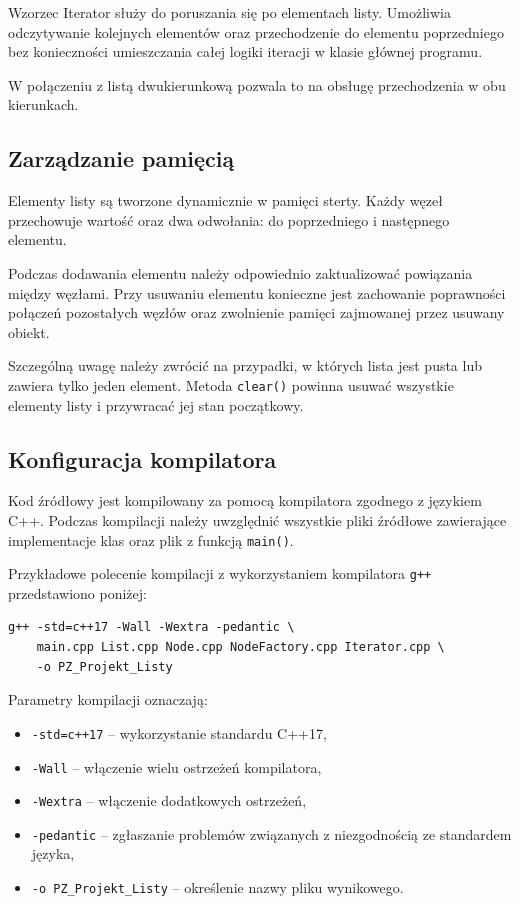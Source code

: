 Wzorzec Iterator służy do poruszania się po elementach listy.
Umożliwia odczytywanie kolejnych elementów oraz przechodzenie
do elementu poprzedniego bez konieczności umieszczania całej
logiki iteracji w klasie głównej programu.

W połączeniu z listą dwukierunkową pozwala to na obsługę
przechodzenia w obu kierunkach.

\subsection{Zarządzanie pamięcią}

Elementy listy są tworzone dynamicznie w pamięci sterty.
Każdy węzeł przechowuje wartość oraz dwa odwołania:
do poprzedniego i następnego elementu.

Podczas dodawania elementu należy odpowiednio zaktualizować
powiązania między węzłami. Przy usuwaniu elementu konieczne
jest zachowanie poprawności połączeń pozostałych węzłów
oraz zwolnienie pamięci zajmowanej przez usuwany obiekt.

Szczególną uwagę należy zwrócić na przypadki, w których lista
jest pusta lub zawiera tylko jeden element. Metoda
\texttt{clear()} powinna usuwać wszystkie elementy listy
i przywracać jej stan początkowy.

\subsection{Konfiguracja kompilatora}

Kod źródłowy jest kompilowany za pomocą kompilatora zgodnego
z językiem C++. Podczas kompilacji należy uwzględnić wszystkie
pliki źródłowe zawierające implementacje klas oraz plik
z funkcją \texttt{main()}.

Przykładowe polecenie kompilacji z wykorzystaniem kompilatora
\texttt{g++} przedstawiono poniżej:

\begin{verbatim}
g++ -std=c++17 -Wall -Wextra -pedantic \
    main.cpp List.cpp Node.cpp NodeFactory.cpp Iterator.cpp \
    -o PZ_Projekt_Listy
\end{verbatim}

Parametry kompilacji oznaczają:

\begin{itemize}
    \item \texttt{-std=c++17} -- wykorzystanie standardu C++17,
    \item \texttt{-Wall} -- włączenie wielu ostrzeżeń kompilatora,
    \item \texttt{-Wextra} -- włączenie dodatkowych ostrzeżeń,
    \item \texttt{-pedantic} -- zgłaszanie problemów związanych
    z niezgodnością ze standardem języka,
    \item \texttt{-o PZ\_Projekt\_Listy} -- określenie nazwy
    pliku wynikowego.
\end{itemize}

